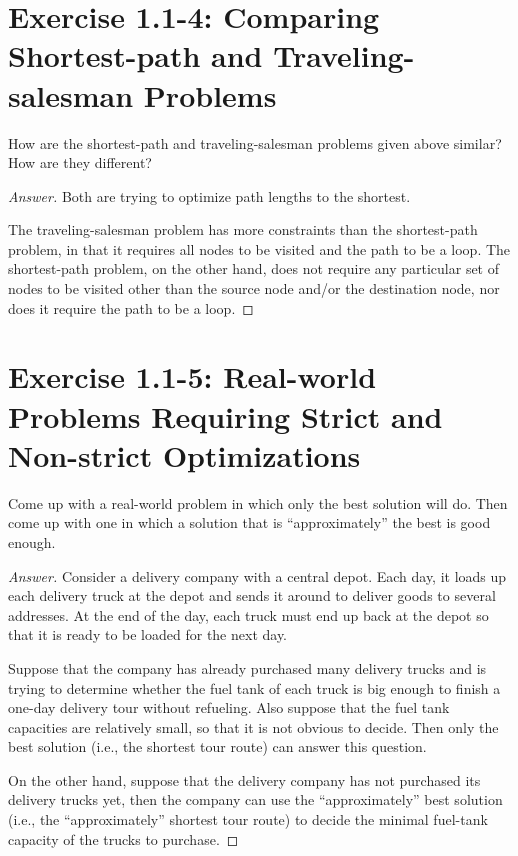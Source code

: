 \documentclass{amsbook}
\theoremstyle{definition}
\theoremstyle{remark}
\numberwithin{section}{chapter}
\numberwithin{equation}{chapter}
\begin{document}
\section{Exercise 1.1-4: Comparing Shortest-path and Traveling-salesman Problems}
How are the shortest-path and traveling-salesman problems given above similar? How are they different?
\begin{proof}[Answer]
Both are trying to optimize path lengths to the shortest.

The traveling-salesman problem has more constraints than the shortest-path problem, in that it requires all nodes to be visited and the path to be a loop. The shortest-path problem, on the other hand, does not require any particular set of nodes to be visited other than the source node and/or the destination node, nor does it require the path to be a loop.
\end{proof}

\section{Exercise 1.1-5: Real-world Problems Requiring Strict and Non-strict Optimizations}
Come up with a real-world problem in which only the best solution will do. Then come up with one in which a solution that is ``approximately'' the best is good enough.
\begin{proof}[Answer]
Consider a delivery company with a central depot. Each day, it loads up each delivery truck at the depot and sends it around to deliver goods to several addresses. At the end of the day, each truck must end up back at the depot so that it is ready to be loaded for the next day.

Suppose that the company has already purchased many delivery trucks and is trying to determine whether the fuel tank of each truck is big enough to finish a one-day delivery tour without refueling. Also suppose that the fuel tank capacities are relatively small, so that it is not obvious to decide. Then only the best solution (i.e., the shortest tour route) can answer this question.

On the other hand, suppose that the delivery company has not purchased its delivery trucks yet, then the company can use the ``approximately'' best solution (i.e., the ``approximately'' shortest tour route) to decide the minimal fuel-tank capacity of the trucks to purchase.
\end{proof}
\end{document}
